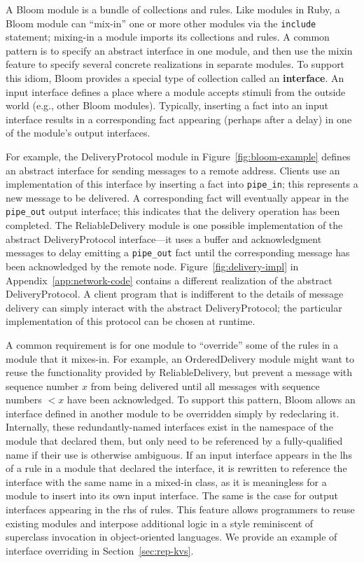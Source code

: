 A Bloom module is a bundle of collections and rules. Like modules in Ruby, a
Bloom module can ``mix-in'' one or more other modules via the \texttt{include}
statement; mixing-in a module imports its collections and rules. A common
pattern is to specify an abstract interface in one module, and then use the
mixin feature to specify several concrete realizations in separate modules. To
support this idiom, Bloom provides a special type of collection called an
\textbf{interface}. An input interface defines a place where a module accepts
stimuli from the outside world (e.g., other Bloom modules). Typically, inserting
a fact into an input interface results in a corresponding fact appearing
(perhaps after a delay) in one of the module's output interfaces.

For example, the DeliveryProtocol module in Figure~\ref{fig:bloom-example}
defines an abstract interface for sending messages to a remote address. Clients
use an implementation of this interface by inserting a fact into
\texttt{pipe\_in}; this represents a new message to be delivered. A
corresponding fact will eventually appear in the \texttt{pipe\_out} output
interface; this indicates that the delivery operation has been completed. The
ReliableDelivery module is one possible implementation of the abstract
DeliveryProtocol interface---it uses a buffer and acknowledgment messages to
delay emitting a \texttt{pipe\_out} fact until the corresponding message has
been acknowledged by the remote node. Figure~\ref{fig:delivery-impl} in
Appendix~\ref{app:network-code} contains a different realization of the abstract
DeliveryProtocol. A client program that is indifferent to the details of message
delivery can simply interact with the abstract DeliveryProtocol; the particular
implementation of this protocol can be chosen at runtime.

A common requirement is for one module to ``override'' some of the rules in a
module that it mixes-in. For example, an OrderedDelivery module might want to
reuse the functionality provided by ReliableDelivery, but prevent a message with
sequence number $x$ from being delivered until all messages with sequence
numbers $<x$ have been acknowledged. To support this pattern, Bloom allows an
interface defined in another module to be overridden simply by redeclaring
it. Internally, these redundantly-named interfaces exist in the namespace of the
module that declared them, but only need to be referenced by a fully-qualified
name if their use is otherwise ambiguous.  If an input interface appears in the
lhs of a rule in a module that declared the interface, it is rewritten to
reference the interface with the same name in a mixed-in class, as it is
meaningless for a module to insert into its own input interface.  The same is
the case for output interfaces appearing in the rhs of rules.  This feature
allows programmers to reuse existing modules and interpose additional logic in a
style reminiscent of superclass invocation in object-oriented languages.  We
provide an example of interface overriding in Section~\ref{sec:rep-kvs}.

